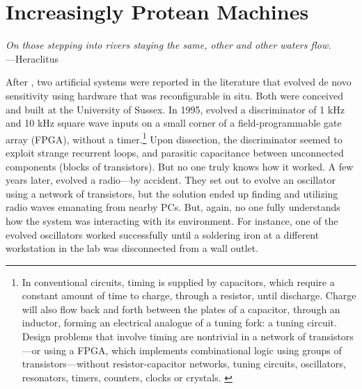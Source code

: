 


\section{Increasingly Protean Machines}



\begin{changemargin}{4em}{4em} 

\vspace{1em}

\textit{On those stepping into rivers staying the same, other and other waters flow.} \\[4pt]
\hspace*{16.5em} ---Heraclitus

\vspace{1em}

\end{changemargin}


\noindent
%
After \citet{pask1958physical},
two artificial systems were reported in the literature that evolved de novo sensitivity using hardware that was reconfigurable in situ.
Both were conceived and built at the University of Sussex.
In 1995, \citet{thompson1996evolved} evolved a discriminator of
1 kHz and 10 kHz square wave inputs on a small corner of a field-programmable gate array (FPGA), without a timer.\footnote{%
In conventional circuits,
timing is supplied by capacitors, which require a constant amount of time to charge, through a resistor, until discharge.
Charge will also flow back and forth between the plates of a capacitor, through an inductor, forming an
electrical analogue of a tuning fork: a tuning circuit.
Design problems that involve timing 
are nontrivial in a network of transistors---or using
a FPGA, which implements combinational logic using groups of transistors---without resistor-capacitor networks, tuning circuits, oscillators, resonators, timers, counters, clocks or crystals.
\label{footnote:rc}
}
Upon dissection, the discriminator seemed to exploit strange 
recurrent loops, and parasitic capacitance between unconnected components (blocks of transistors).
But no one truly knows how it worked.
A few years later, \citet{bird2002evolved} evolved a radio---by accident.
They set out to evolve an oscillator using a network of transistors,
but the solution ended up finding and utilizing radio waves emanating from nearby PCs.
But, again, no one fully understands how the system was interacting with its environment. 
For instance, one of the evolved oscillators worked successfully until a soldering iron at a different workstation in the lab was disconnected from a wall outlet.

